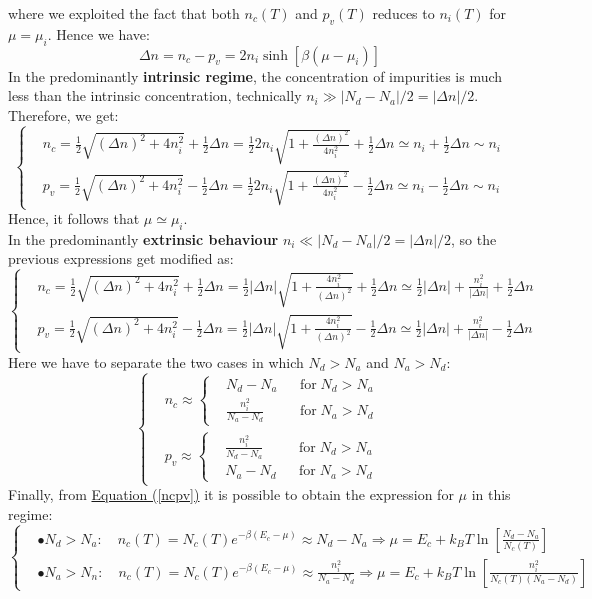 \documentclass[10.75pt,a4paper,openright,bottom=2cm]{article}
\renewcommand{\refeq}[1]{\hyperref[#1]{Equation (\ref{#1})}}
\begin{document}
where we exploited the fact that both $n_c(T)$ and $p_v(T)$ reduces to $n_i(T)$ for $\mu=\mu_i$. Hence we have:
\[
\Delta n=n_c-p_v=2n_i\sinh{[\beta(\mu-\mu_i)]}
\]
 In the predominantly \textbf{intrinsic regime}, the concentration of impurities is much less than the intrinsic concentration, technically $n_i\gg|N_d-N_a|/2=|\Delta n|/2$. Therefore, we get:
\[
\left\{
\begin{aligned}
&n_c=\frac{1}{2}\sqrt{(\Delta n)^2+4n_i^2}+\frac{1}{2}\Delta n=\frac{1}{2}2n_i\sqrt{1+\frac{(\Delta n)^2}{4n_i^2}}+\frac{1}{2}\Delta n\simeq n_i+\frac{1}{2}\Delta n\sim n_i\\
&p_v=\frac{1}{2}\sqrt{(\Delta n)^2+4n_i^2}-\frac{1}{2}\Delta n=\frac{1}{2}2n_i\sqrt{1+\frac{(\Delta n)^2}{4n_i^2}}-\frac{1}{2}\Delta n\simeq n_i-\frac{1}{2}\Delta n\sim n_i
\end{aligned}
\right.
\]
Hence, it follows that $\mu\simeq\mu_i$.\\
In the predominantly \textbf{extrinsic behaviour} $n_i\ll|N_d-N_a|/2=|\Delta n|/2$, so the previous expressions get modified as:
\[
\left\{
\begin{aligned}
&n_c=\frac{1}{2}\sqrt{(\Delta n)^2+4n_i^2}+\frac{1}{2}\Delta n=\frac{1}{2}|\Delta n|\sqrt{1+\frac{4n_i^2}{(\Delta n)^2}}+\frac{1}{2}\Delta n\simeq \frac{1}{2}|\Delta n|+\frac{n_i^2}{|\Delta n|}+\frac{1}{2}\Delta n\\
&p_v=\frac{1}{2}\sqrt{(\Delta n)^2+4n_i^2}-\frac{1}{2}\Delta n=\frac{1}{2}|\Delta n|\sqrt{1+\frac{4n_i^2}{(\Delta n)^2}}-\frac{1}{2}\Delta n\simeq \frac{1}{2}|\Delta n|+\frac{n_i^2}{|\Delta n|}-\frac{1}{2}\Delta n
\end{aligned}
\right.
\]
Here we have to separate the two cases in which $N_d>N_a$ and $N_a>N_d$:
\[
\left\{
\begin{aligned}
&n_c\approx\left\{
\begin{aligned}&N_d-N_a&&\text{for}\;N_d>N_a\\
&\frac{n_i^2}{N_a-N_d}&&\text{for}\;N_a>N_d
\end{aligned}
\right.\\
&p_v\approx\left\{
\begin{aligned}&\frac{n_i^2}{N_d-N_a}&&\text{for}\;N_d>N_a\\
&N_a-N_d&&\text{for}\;N_a>N_d
\end{aligned}
\right.
\end{aligned}
\right.
\]
Finally, from \refeq{ncpv} it is possible to obtain the expression for $\mu$ in this regime:
\[
\left\{
\begin{aligned}
&\bullet N_d>N_a: \quad n_c(T)=N_c(T)e^{-\beta(E_c-\mu)}\approx N_d-N_a\Rightarrow\mu=E_c+k_BT\ln\left[\frac{N_d-N_a}{N_c(T)}\right]\\
&\bullet N_a>N_n: \quad n_c(T)=N_c(T)e^{-\beta(E_c-\mu)}\approx \frac{n_i^2}{N_a-N_d}\Rightarrow\mu=E_c+k_BT\ln\left[\frac{n_i^2}{N_c(T)(N_a-N_d)}\right]
\end{aligned}
\right.
\]
\end{document}
